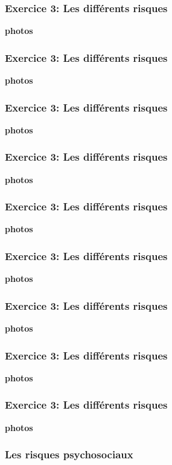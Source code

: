\documentclass{beamer}
\begin{document}
\begin{frame}
\frametitle{Exercice 3: Les différents risques}
\textbf{photos}
\end{frame}

\begin{frame}
\frametitle{Exercice 3: Les différents risques}
\textbf{photos}
\end{frame}

\begin{frame}
\frametitle{Exercice 3: Les différents risques}
\textbf{photos}
\end{frame}

\begin{frame}
\frametitle{Exercice 3: Les différents risques}
\textbf{photos}
\end{frame}

\begin{frame}
\frametitle{Exercice 3: Les différents risques}
\textbf{photos}
\end{frame}

\begin{frame}
\frametitle{Exercice 3: Les différents risques}
\textbf{photos}
\end{frame}

\begin{frame}
\frametitle{Exercice 3: Les différents risques}
\textbf{photos}
\end{frame}

\begin{frame}
\frametitle{Exercice 3: Les différents risques}
\textbf{photos}
\end{frame}

\begin{frame}
\frametitle{Exercice 3: Les différents risques}
\textbf{photos}
\end{frame}

\begin{frame}
\frametitle{Les risques psychosociaux}

\end{frame}
\end{document}
